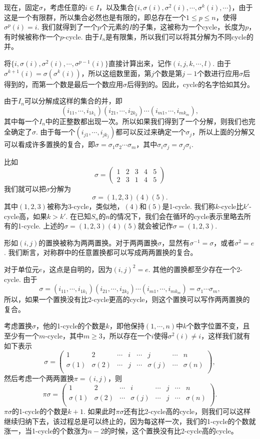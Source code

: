 \documentclass[9pt]{extarticle}
\begin{document}
\para 现在，固定$\sigma$，考虑任意的$i\in I$，以及集合$\{i,\sigma(i),\sigma^2(i),\cdots,\sigma^k(i),\cdots\}$，由于这是一个有限群，所以集合必然也是有限的，即总存在一个$1\leq p\leq n$，使得$\sigma^p(i)=i$. 我们就得到了一个$p$个元素的$I$的子集，这被称为一个cycle，长度为$p$，有时候被称作一个$p$-cycle. 由于$I_n$是有限集，所以我们可以将其分解为不同cycle的并。

将$\{i,\sigma(i),\sigma^2(i),\cdots,\sigma^{p-1}(i)\}$直接计算出来，记作$(i,j,k,\cdots,l)$. 由于$\sigma^{k+1}(i)=\sigma(\sigma^k(i))$，所以这组数里面，第$j$个数是第$j-1$个数进行应用$\sigma$后得到的，而第一个数是最后一个数应用$\sigma$后得到的。因此，cycle的名字恰如其分。

由于$I_n$可以分解成这样的集合的并，即
\[
	(i_{11},\cdots,i_{1k_1})(i_{21},\cdots,i_{2k_2})\cdots (i_{m1},\cdots,i_{mk_m}),
\]
其中每一个$I_n$中的正整数都出现一次。所以如果我们得到了一个分解，则我们也完全确定了$\sigma$. 由于每一个$(i_{j1},\cdots,i_{jk_j})$都可以反过来确定一个$\sigma_j$，所以上面的分解又可以看成许多置换的复合，即$\sigma=\sigma_1 \sigma_2\cdots \sigma_m$，其中$\sigma_i\sigma_j=\sigma_j\sigma_i$. 

比如
\[
	\sigma=\begin{pmatrix}
	1&2&3&4&5\\
	2&3&1&4&5
	\end{pmatrix}
\]
我们就可以把$\sigma$分解为
\[
	\sigma=(1,2,3)(4)(5).
\]
其中$(1,2,3)$被称为3-cycle，类似地，$(4)$和$(5)$是1-cycle. 我们称$k$-cycle比$k'$-cycle高，如果$k>k'$. 在已知$S_n$的$n$的情况下，我们会在循环的cycle表示里略去所有的1-cycle. 上述的$\sigma=(1,2,3)(4)(5)$就会被记作$\sigma=(1,2,3)$.

\pro 形如$(i,j)$的置换被称为两两置换。对于两两置换$\sigma$，显然有$\sigma^{-1}=\sigma$，或者$\sigma^2=e$. 我们断言，对称群中的任意置换都可以写成两两置换的复合。

\proof 对于单位元$e$，这点是自明的，因为$(i,j)^2=e$. 其他的置换都至少存在一个2-cycle. 由于
\[
	\sigma=(i_{11},\cdots,i_{1k_1})(i_{21},\cdots,i_{2k_2})\cdots (i_{m1},\cdots,i_{mk_m})=\sigma_1 \cdots \sigma_m,
\]
所以，如果一个置换没有比$2$-cycle更高的cycle，则这个置换可以写作两两置换的复合。

考虑置换$\sigma$，他的1-cycle的个数是$k$，即他保持$(1,\cdots,n)$中$k$个数字位置不变，且至少有一个$m$-cycle，其中$m\geq 3$，所以存在一个$i$使得$\sigma^2(i)\neq i$，这样我们就有如下表示
\[
	\sigma=\begin{pmatrix}
	1&2&\cdots&i&\cdots &j&\cdots&n\\
	\sigma(1)&\sigma(2)&\cdots&j&\cdots &\sigma(j)&\cdots&\sigma(n)\\
	\end{pmatrix},
\]
然后考虑一个两两置换$\pi=(i,j)$，则
\[
	\pi\sigma=\begin{pmatrix}
	1&2&\cdots&i&\cdots &j&\cdots&n\\
	\sigma(1)&\sigma(2)&\cdots&\sigma(j)&\cdots &j&\cdots&\sigma(n)\\
	\end{pmatrix}.
\]
$\pi\sigma$的1-cycle的个数是$k+1$. 如果此时$\pi\sigma$还有比2-cycle高的cycle，则我们可以这样继续归纳下去，该过程总是可以终止的，因为每这样一次，我们的1-cycle的个数就涨一，当1-cycle的个数涨为$n-2$的时候，这个置换没有比2-cycle高的cycle。
\end{document}
